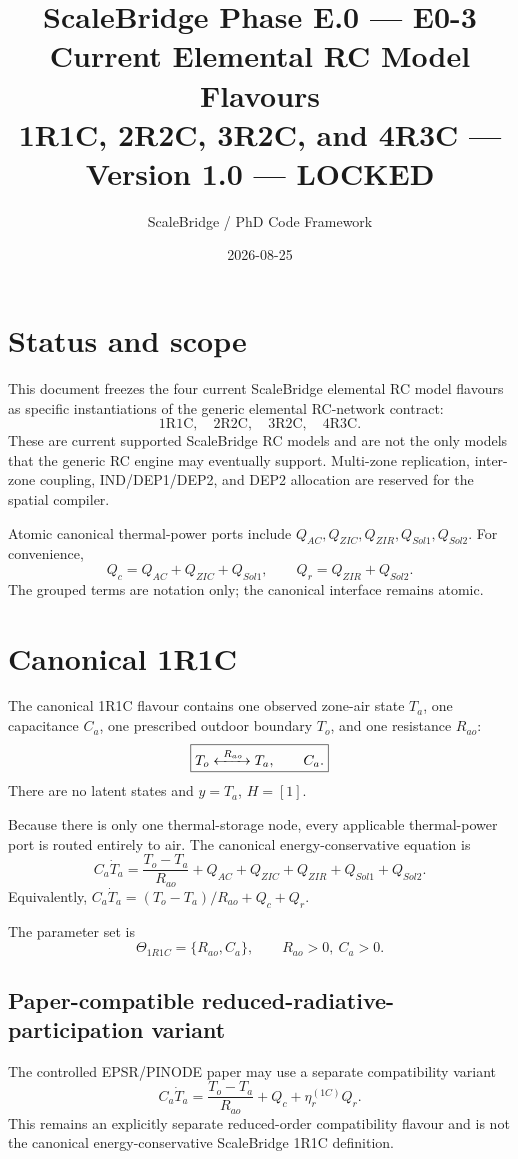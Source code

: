 \documentclass[11pt]{article}
\title{ScaleBridge Phase E.0 --- E0-3\\Current Elemental RC Model Flavours\\\large 1R1C, 2R2C, 3R2C, and 4R3C --- Version 1.0 --- LOCKED}
\author{ScaleBridge / PhD Code Framework}
\date{2026-08-25}
\begin{document}
\maketitle
\section*{Status and scope}
This document freezes the four current ScaleBridge elemental RC model flavours as specific instantiations of the generic elemental RC-network contract:
\[
\boxed{\text{1R1C},\quad\text{2R2C},\quad\text{3R2C},\quad\text{4R3C}.}
\]
These are current supported ScaleBridge RC models and are not the only models that the generic RC engine may eventually support. Multi-zone replication, inter-zone coupling, IND/DEP1/DEP2, and DEP2 allocation are reserved for the spatial compiler.

Atomic canonical thermal-power ports include $Q_{AC},Q_{ZIC},Q_{ZIR},Q_{Sol1},Q_{Sol2}$. For convenience,
\[
Q_c=Q_{AC}+Q_{ZIC}+Q_{Sol1},\qquad Q_r=Q_{ZIR}+Q_{Sol2}.
\]
The grouped terms are notation only; the canonical interface remains atomic.

\section{Canonical 1R1C}
The canonical 1R1C flavour contains one observed zone-air state $T_a$, one capacitance $C_a$, one prescribed outdoor boundary $T_o$, and one resistance $R_{ao}$:
\[
\boxed{T_o\xleftrightarrow{\ R_{ao}\ }T_a,\qquad C_a.}
\]
There are no latent states and $y=T_a$, $H=[1]$.

Because there is only one thermal-storage node, every applicable thermal-power port is routed entirely to air. The canonical energy-conservative equation is
\[
\boxed{C_a\dot T_a=\frac{T_o-T_a}{R_{ao}}+Q_{AC}+Q_{ZIC}+Q_{ZIR}+Q_{Sol1}+Q_{Sol2}.}
\tag{1R1C}
\]
Equivalently, $C_a\dot T_a=(T_o-T_a)/R_{ao}+Q_c+Q_r$.

The parameter set is
\[
\boxed{\Theta_{1R1C}=\{R_{ao},C_a\},\qquad R_{ao}>0,\ C_a>0.}
\]

\subsection{Paper-compatible reduced-radiative-participation variant}
The controlled EPSR/PINODE paper may use a separate compatibility variant
\[
C_a\dot T_a=\frac{T_o-T_a}{R_{ao}}+Q_c+\eta_r^{(1C)}Q_r.
\]
This remains an explicitly separate reduced-order compatibility flavour and is not the canonical energy-conservative ScaleBridge 1R1C definition.
\end{document}
